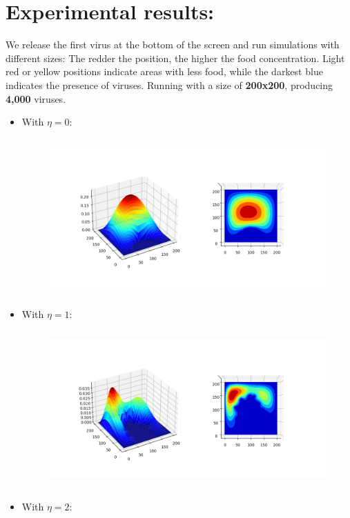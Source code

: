 \documentclass[a4paper,10pt,notitlepage]{article}
\begin{document}
{{{\section{\textbf{Experimental results:}}
{\setlength{\parskip}{0.5cm}
    \vspace{0.5cm}
    \hspace{1 cm}
    We release the first virus at the bottom of the screen and run simulations with different sizes:
The redder the position, the higher the food concentration. Light red or yellow positions indicate areas with less food, while the darkest blue indicates the presence of viruses.
\newpage
Running with a size of \textbf{200x200}, producing \textbf{4,000} viruses.

\begin{itemize}
    \item With $\eta=0$:
    \begin{figure}[h]
        \centering
        \includegraphics[trim=70pt 40pt 100pt 60pt, clip, height = 6cm]{200x200p0plot.png}
    \end{figure}
    \item  With $\eta = 1$:
    \begin{figure}[h]
        \centering
        \includegraphics[trim=70pt 40pt 100pt 60pt, clip, height = 6cm]{200x200p1plot.png}
    \end{figure}
    \item  With $\eta = 2$:

\end{itemize}}}}}
\end{document}
